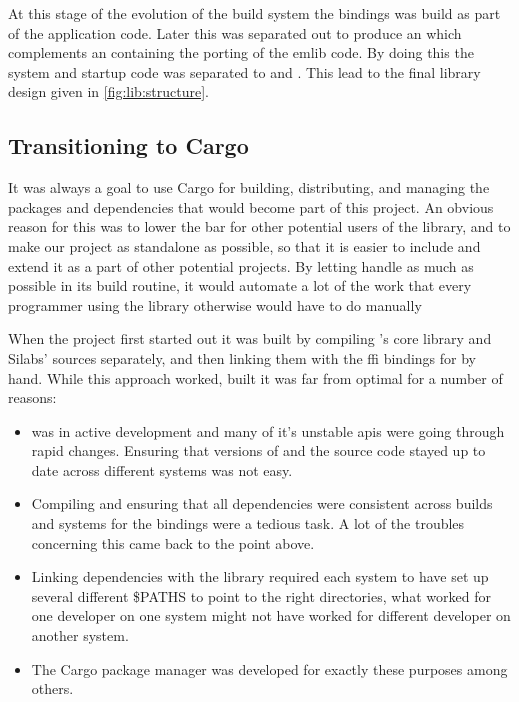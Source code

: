 At this stage of the evolution of the build system the {\emlib} bindings was build as part of the {\rust} application code.
Later this was separated out to produce an  which complements an  containing the {\C} porting of the emlib code.
By doing this the system and startup code was separated to  and .
This lead to the final library design given in \autoref{fig:lib:structure}.

\subsection{Transitioning to Cargo}
\label{ssub:transitioning_to_cargo}

It was always a goal to use Cargo for building, distributing, and managing the packages and dependencies that would become part of this project.
An obvious reason for this was to lower the bar for other potential users of the library, and to make our project as standalone as possible, so that it is easier to include and extend it as a part of other potential projects.
By letting {\cargo} handle as much as possible in its build routine, it would automate a lot of the work that every programmer using the library otherwise would have to do manually

When the project first started out it was built by compiling {\rust}'s core library and Silabs' {\emlib} {\C} sources separately, and then linking them with the \gls{ffi} bindings for {\emlib} by hand.
While this approach worked, built it was far from optimal for a number of reasons:

\begin{itemize}
    \item {\rust} was in active development and many of it's unstable \glspl{api} were going through rapid changes. Ensuring that versions of {\rustc} and the {\rust} source code stayed up to date across different systems was not easy.
    \item Compiling and ensuring that all dependencies were consistent across builds and systems for the bindings were a tedious task. A lot of the troubles concerning this came back to the point above.
    \item Linking dependencies with the library required each system to have set up several different \$PATHS to point to the right directories, what worked for one developer on one system might not have worked for different developer on another system.
    \item The Cargo package manager was developed for exactly these purposes among others.
\end{itemize}

